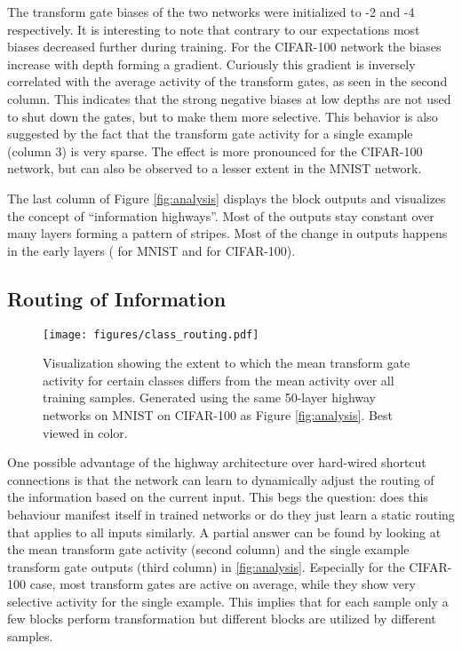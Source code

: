\documentclass{article}
\begin{document}
The transform gate biases of the two networks were initialized to -2 and -4 respectively. 
It is interesting to note that contrary to our expectations most biases decreased further during training. 
For the CIFAR-100 network the biases increase with depth forming a gradient. 
Curiously this gradient is inversely correlated with the average activity of the transform gates, as seen in the second column.
This indicates that the strong negative biases at low depths are not used to shut down the gates, but to make them more selective. 
This behavior is also suggested by the fact that the transform gate activity for a single example (column 3) is very sparse. 
The effect is more pronounced for the CIFAR-100 network, but can also be observed to a lesser extent in the MNIST network.

The last column of Figure \ref{fig:analysis} displays the block outputs and visualizes the concept of ``information highways''.
Most of the outputs stay constant over many layers forming a pattern of stripes. 
Most of the change in outputs happens in the early layers ( for MNIST and  for CIFAR-100). 

\subsection{Routing of Information}
\begin{figure*}[t]
\texttt{[image: figures/class\_routing.pdf]}
\caption{Visualization showing the extent to which the mean transform gate activity for certain classes differs from the mean activity over all training samples. Generated using the same 50-layer highway networks on MNIST on CIFAR-100 as Figure \ref{fig:analysis}. Best viewed in color.}
\label{fig:classes}
\end{figure*}

One possible advantage of the highway architecture over hard-wired shortcut connections is that the network can learn to dynamically adjust the routing of the information based on the current input.
This begs the question: does this behaviour manifest itself in trained networks or do they just learn a static routing that applies to all inputs similarly.
A partial answer can be found by looking at the mean transform gate activity (second column) and the single example transform gate outputs (third column) in \autoref{fig:analysis}.
Especially for the CIFAR-100 case, most transform gates are active on average, while they show very selective activity for the single example.
This implies that for each sample only a few blocks perform transformation but different blocks are utilized by different samples.
\end{document}
